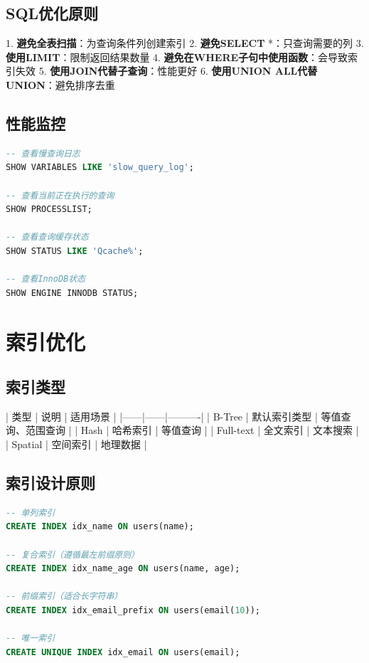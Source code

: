 \documentclass[12pt,UTF8]{ctexbook}
\begin{document}
\subsection*{SQL优化原则}

1. \textbf{避免全表扫描}：为查询条件列创建索引
2. \textbf{避免SELECT }*：只查询需要的列
3. \textbf{使用LIMIT}：限制返回结果数量
4. \textbf{避免在WHERE子句中使用函数}：会导致索引失效
5. \textbf{使用JOIN代替子查询}：性能更好
6. \textbf{使用UNION ALL代替UNION}：避免排序去重

\subsection*{性能监控}

\begin{lstlisting}[language=sql]
-- 查看慢查询日志
SHOW VARIABLES LIKE 'slow_query_log';

-- 查看当前正在执行的查询
SHOW PROCESSLIST;

-- 查看查询缓存状态
SHOW STATUS LIKE 'Qcache%';

-- 查看InnoDB状态
SHOW ENGINE INNODB STATUS;
\end{lstlisting}

\section{索引优化}
\label{sec:db-index-tuning}

\subsection*{索引类型}

| 类型 | 说明 | 适用场景 |
|------|------|----------|
| B-Tree | 默认索引类型 | 等值查询、范围查询 |
| Hash | 哈希索引 | 等值查询 |
| Full-text | 全文索引 | 文本搜索 |
| Spatial | 空间索引 | 地理数据 |

\subsection*{索引设计原则}

\begin{lstlisting}[language=sql]
-- 单列索引
CREATE INDEX idx_name ON users(name);

-- 复合索引（遵循最左前缀原则）
CREATE INDEX idx_name_age ON users(name, age);

-- 前缀索引（适合长字符串）
CREATE INDEX idx_email_prefix ON users(email(10));

-- 唯一索引
CREATE UNIQUE INDEX idx_email ON users(email);
\end{lstlisting}
\end{document}
